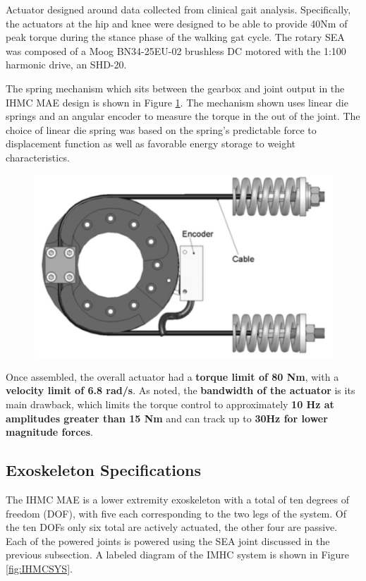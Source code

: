  Actuator designed around data collected from clinical gait analysis.  Specifically, the actuators at the hip and knee were designed to be able to provide 40Nm of peak torque during the stance phase of the walking gat cycle.  The rotary SEA was composed of a Moog BN34-25EU-02 brushless DC motored with the 1:100 harmonic drive, an SHD-20.  
 
The spring mechanism which sits between the gearbox and joint output in the IHMC MAE design is shown in Figure \ref{fig:IHMCSEA}.  The mechanism shown uses linear die springs and an angular encoder to measure the torque in the out of the joint.  The choice of linear die spring was based on the spring's predictable force to displacement function as well as favorable energy storage to weight characteristics.  
\begin{figure}[thpb]
\centering
\includegraphics[width=3.in]{exos/figs/ihmc/seaAssm}
  \caption{}
  \vspace{-0.2in}
 \label{fig:IHMCSEA}   
 \end{figure}
 
Once assembled, the overall actuator had a  {\bf torque limit of 80 Nm}, with a {\bf velocity limit of 6.8 rad/s}.  As noted, the {\bf bandwidth of the actuator} is its main drawback, which limits the torque control to approximately {\bf 10 Hz at amplitudes greater than 15 Nm} and can track up to {\bf 30Hz for lower magnitude forces}. 
 
 \subsection{Exoskeleton Specifications}
 
 The IHMC MAE is a lower extremity exoskeleton with a total of ten degrees of freedom (DOF), with five each corresponding to the two legs of the system.  Of the ten DOFs only six total are actively actuated, the other four are passive.  Each of the powered joints is powered using the SEA joint discussed in the previous subsection.  A labeled diagram of the IMHC system is shown in Figure \ref{fig:IHMCSYS}.  
 
